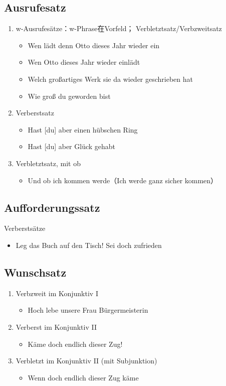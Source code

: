 \documentclass[UTF8]{report}
\begin{document}
\subsection{Ausrufesatz}
\begin{enumerate}
    \item w-Ausrufesätze：w-Phrase在Vorfeld； Verbletztsatz/Verbzweitsatz
    \begin{itemize}
        \item Wen lädt denn Otto dieses Jahr wieder ein
        \item Wen Otto dieses Jahr wieder einlädt
        \item Welch großartiges Werk sie da wieder geschrieben hat
        \item Wie groß du geworden bist
    \end{itemize}
    \item Verberstsatz
    \begin{itemize}
        \item Hast [du] aber einen hübschen Ring
        \item Hast [du] aber Glück gehabt
    \end{itemize}
    \item Verbletztsatz, mit ob
    \begin{itemize}
        \item Und ob ich kommen werde（Ich werde ganz sicher kommen）
    \end{itemize}
\end{enumerate}

\subsection{Aufforderungssatz}
Verberstsätze
\begin{itemize}
    \item Leg das Buch auf den Tisch! Sei doch zufrieden
\end{itemize}

\subsection{Wunschsatz}
\begin{enumerate}
    \item Verbzweit im Konjunktiv I
    \begin{itemize}
        \item Hoch lebe unsere Frau Bürgermeisterin
    \end{itemize}
    \item Verberst im Konjunktiv II
    \begin{itemize}
        \item Käme doch endlich dieser Zug!
    \end{itemize}
    \item Verbletzt im Konjunktiv II  (mit Subjunktion)
    \begin{itemize}
        \item Wenn doch endlich dieser Zug käme
    \end{itemize}
\end{enumerate}
\end{document}
